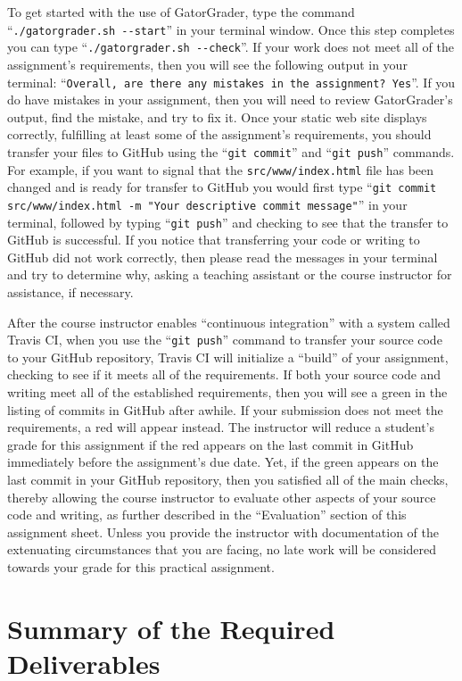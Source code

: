 \documentclass[11pt]{article}
\newcommand{\mainprogramsource}{\lstinline{src/www/index.html}}
\newcommand{\gatorgraderstart}{\command{./gatorgrader.sh --start}}
\newcommand{\gatorgradercheck}{\command{./gatorgrader.sh --check}}
\newcommand{\gitcommit}{\command{git commit}}
\newcommand{\gitpush}{\command{git push}}
\newcommand{\gitcommitmainprogram}{\command{git commit src/www/index.html -m "Your
descriptive commit message"}}
\newcommand{\command}[1]{``\lstinline{#1}''}
\newcommand{\step}[1]{``{#1}''}
\newcommand{\checkmark}{\ding{51}}
\newcommand{\naughtmark}{\ding{55}}
\begin{document}
To get started with the use of GatorGrader, type the command \gatorgraderstart{} in your terminal window. Once this step
completes you can type \gatorgradercheck{}. If your work does not meet all of the assignment's requirements, then you
will see the following output in your terminal: \command{Overall, are there any mistakes in the assignment? Yes}. If you
do have mistakes in your assignment, then you will need to review GatorGrader's output, find the mistake, and try to fix
it. Once your static web site displays correctly, fulfilling at least some of the assignment's requirements, you should
transfer your files to GitHub using the \gitcommit{} and \gitpush{} commands. For example, if you want to signal that
the \mainprogramsource{} file has been changed and is ready for transfer to GitHub you would first type
\gitcommitmainprogram{} in your terminal, followed by typing \gitpush{} and checking to see that the transfer to GitHub
is successful. If you notice that transferring your code or writing to GitHub did not work correctly, then please read
the messages in your terminal and try to determine why, asking a teaching assistant or the course instructor for
assistance, if necessary.

After the course instructor enables \step{continuous integration} with a system called Travis CI, when you use the
\gitpush{} command to transfer your source code to your GitHub repository, Travis CI will initialize a \step{build} of
your assignment, checking to see if it meets all of the requirements. If both your source code and writing meet all of
the established requirements, then you will see a green \checkmark{} in the listing of commits in GitHub after awhile.
If your submission does not meet the requirements, a red \naughtmark{} will appear instead. The instructor will reduce a
student's grade for this assignment if the red \naughtmark{} appears on the last commit in GitHub immediately before the
assignment's due date. Yet, if the green \checkmark{} appears on the last commit in your GitHub repository, then you
satisfied all of the main checks, thereby allowing the course instructor to evaluate other aspects of your source code
and writing, as further described in the \step{Evaluation} section of this assignment sheet. Unless you provide the
instructor with documentation of the extenuating circumstances that you are facing, no late work will be considered
towards your grade for this practical assignment.

\section*{Summary of the Required Deliverables}
\end{document}
